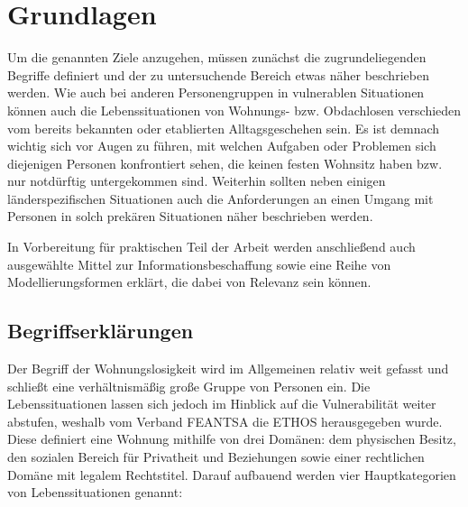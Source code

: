 \chapter{Grundlagen}\label{ch:preliminaries}

Um die genannten Ziele anzugehen, müssen zunächst die zugrundeliegenden Begriffe definiert und der zu untersuchende Bereich etwas näher beschrieben werden. Wie auch bei anderen Personengruppen in vulnerablen Situationen können auch die Lebenssituationen von Wohnungs- bzw. Obdachlosen verschieden vom bereits bekannten oder etablierten Alltagsgeschehen sein. Es ist demnach wichtig sich vor Augen zu führen, mit welchen Aufgaben oder Problemen sich diejenigen Personen konfrontiert sehen, die keinen festen Wohnsitz haben bzw. nur notdürftig untergekommen sind. Weiterhin sollten neben einigen länderspezifischen Situationen auch die Anforderungen an einen Umgang mit Personen in solch prekären Situationen näher beschrieben werden.

In Vorbereitung für praktischen Teil der Arbeit werden anschließend auch ausgewählte Mittel zur Informationsbeschaffung sowie eine Reihe von Modellierungsformen erklärt, die dabei von Relevanz sein können.

\section{Begriffserklärungen}\label{sec:definitions}

Der Begriff der Wohnungslosigkeit wird im Allgemeinen relativ weit gefasst und schließt eine verhältnismäßig große Gruppe von Personen ein. Die Lebenssituationen lassen sich jedoch im Hinblick auf die Vulnerabilität weiter abstufen, weshalb vom Verband FEANTSA \citep{ethos} die \ac{ETHOS} herausgegeben wurde. Diese definiert eine Wohnung mithilfe von drei Domänen: dem physischen Besitz, den sozialen Bereich für Privatheit und Beziehungen sowie einer rechtlichen Domäne mit legalem Rechtstitel. Darauf aufbauend werden vier Hauptkategorien von Lebenssituationen genannt:

